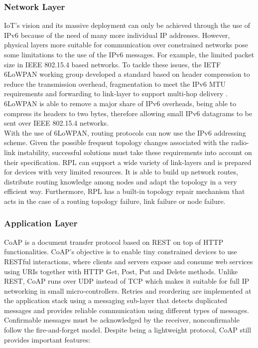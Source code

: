 \documentclass{llncs}
\begin{document}
\subsubsection{Network Layer}
\label{sec:network_layer}
\ac{IoT}'s vision and its massive deployment can only be achieved through the use of IPv6 \cite{Pickard2015} because of the need of many more individual IP addresses. 
However, physical layers more suitable for communication over constrained networks pose some limitations to the use of the IPv6 messages. 
For example, the limited packet size in IEEE 802.15.4 based networks. 
To tackle these issues, the \ac{IETF} \ac{6LoWPAN} \cite{Shelby2012} working group developed a standard based on header compression to reduce the transmission overhead, fragmentation to meet the IPv6 \ac{MTU} requirements and forwarding to link-layer to support multi-hop delivery \cite{Hui2008}. 
\ac{6LoWPAN} is able to remove a major share of IPv6 overheads, being able to compress its headers to two bytes, therefore allowing small IPv6 datagrams to be sent over IEEE 802.15.4 networks. \\
With the use of 6LoWPAN, routing protocols can now use the IPv6 addressing scheme. 
Given the possible frequent topology changes associated with the radio-link instability, successful solutions must take these requirements into account on their specification.
\ac{RPL} \cite{Winter2012} can support a wide variety of link-layers and is prepared for devices with very limited resources. 
It is able to build up network routes, distribute routing knowledge among nodes and adapt the topology in a very efficient way. 
Furthermore, \ac{RPL} has a built-in topology repair mechanism that acts in the case of a routing topology failure, link failure or node failure.

\subsubsection{Application Layer}
\ac{CoAP} \cite{Shelby2014} is a document transfer protocol based on \ac{REST} on top of \ac{HTTP} functionalities. 
\ac{CoAP}'s objective is to enable tiny constrained devices to use RESTful interactions, where clients and servers expose and consume web services using \ac{URIs} together with  \ac{HTTP} Get, Post, Put and Delete methods. 
Unlike \ac{REST}, \ac{CoAP} runs over \ac{UDP} instead of \ac{TCP} which makes it suitable for full IP networking in small micro-controllers. 
Retries and reordering are implemented at the application stack using a messaging sub-layer that detects duplicated messages and provides reliable communication using different types of messages. 
Confirmable messages must be acknowledged by the receiver, nonconfirmable follow the fire-and-forget model. 
Despite being a lightweight protocol, \ac{CoAP} still provides important features:
	
\end{document}

